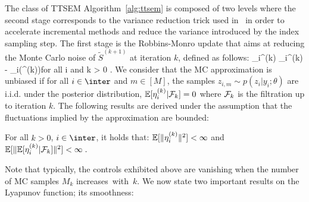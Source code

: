 \documentclass[12pt]{article}
\begin{document}
The class of TTSEM Algorithm~\ref{alg:ttsem} is composed of two levels where the second stage corresponds to the variance reduction trick used in~\citet{karimi2019global} in order to accelerate incremental methods and reduce the variance introduced by the index sampling step. 
The first stage is the Robbins-Monro update that aims at reducing the Monte Carlo noise of $\tilde{S}^{(k+1)}$ at iteration $k$, defined as follows:
\beq\label{eq:mcerror}
\eta_{i}^{(k)} \eqdef {}_{i}^{(k)} -  \overline{\bss}_i(\vartheta^{(k)})\quad  \textrm{for all} \quad  i \in \inter \quad \textrm{and} \quad  k > 0 \eqs.
\eeq
We consider that the MC approximation is unbiased if for all $ i \in \inter$ and $m \in [M]$, the samples $z_{i,m} \sim p(z_i|y_i;\theta)$ are i.i.d. under the posterior distribution, \ie $\mathbb{E}[\eta_{i}^{(k)}|{\cal F}_k] = 0$ where  ${\cal F}_k$ is the filtration up to iteration $k$.
The following results are derived under the assumption that the fluctuations implied by the approximation are bounded:
\begin{assumption}\label{ass:mcerror}
For all $k >0$, $i \in \inter$, it holds that: 
$\mathbb{E} [\| \eta_{i}^{(k)}\|^2 ] < \infty$ and $\mathbb{E}[\| \mathbb{E}[\eta_{i}^{(k)}|{\cal F}_k]\|^2] < \infty \;.$
\end{assumption}
Note that typically, the controls exhibited above are vanishing when the number of MC samples $M_k$ increases~with~$k$.
We now state two important results on the Lyapunov function; its smoothness:
\end{document}
